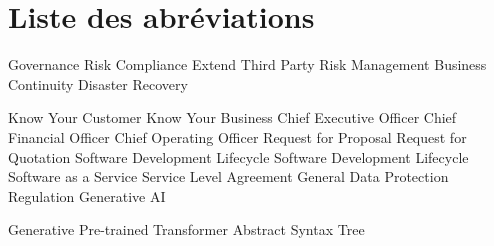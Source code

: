 \chapter*{Liste des abréviations}

\adjustmtc
\thispagestyle{MyStyle}

\begin{acronym}

 {Governance Risk Compliance }
 {Extend Third Party Risk Management }
 {Business Continuity}
 {Disaster Recovery}

 {Know Your Customer}
 {Know Your Business}
 {Chief Executive Officer}
 {Chief Financial Officer}
 {Chief Operating Officer}
 {Request for Proposal}
 {Request for Quotation}
 {Software Development Lifecycle}
 {Software Development Lifecycle}
 {Software as a Service}
 {Service Level Agreement}
 {General Data Protection Regulation}
 {Generative AI}







 {Generative Pre-trained Transformer}
 {Abstract Syntax Tree}






\end{acronym}